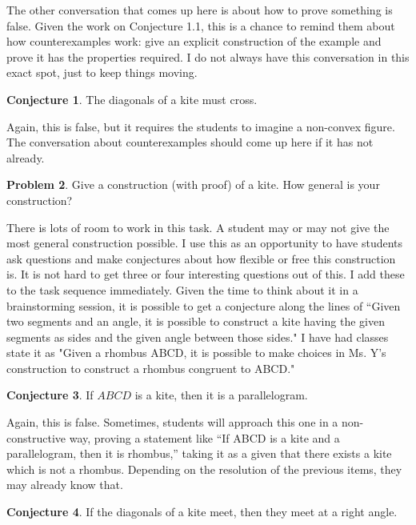 \documentclass{tufte-handout}
\theoremstyle{definition}
\newtheorem{problem}{Problem}[section]
\newtheorem{conjecture}[problem]{Conjecture}
\begin{document}
The other conversation that comes up here is about how to prove something is false. Given the work on Conjecture 1.1, this is a chance to remind them about how counterexamples work: give an explicit construction of the example and prove it has the properties required. I do not always have this conversation in this exact spot, just to keep things moving.

\begin{conjecture}
\label{conj:kite-diagonals-cross}
The diagonals of a kite must cross.
\end{conjecture}

Again, this is false, but it requires the students to imagine a non-convex figure. The conversation about counterexamples should come up here if it has not already.

\begin{problem}
\label{prob:construct-kites}
Give a construction (with proof) of a kite.
How general is your construction?
\end{problem}

There is lots of room to work in this task. A student may or may not give the most general construction possible. I use this as an opportunity to have students ask questions and make conjectures about how flexible or free this construction is. It is not hard to get three or four interesting questions out of this. I add these to the task sequence immediately. Given the time to think about it in a brainstorming session, it is possible to get a conjecture along the lines of ``Given two segments and an angle, it is possible to construct a kite having the given segments as sides and the given angle between those sides." I have had classes state it as "Given a rhombus ABCD, it is possible to make choices in Ms. Y's construction to construct a rhombus congruent to ABCD."

\begin{conjecture}
\label{conj:kite-is-parallelogram}
If $ABCD$ is a kite, then it is a parallelogram.
\end{conjecture}

Again, this is false. Sometimes, students will approach this one in a non-constructive way, proving a statement like ``If ABCD is a kite and a parallelogram, then it is rhombus,'' taking it as a given that there exists a kite which is not a rhombus. Depending on the resolution of the 
previous items, they may already know that.


\begin{conjecture}
\label{conj:kite-diagonals-perpendicular}
If the diagonals of a kite meet, then they meet at a right angle.
\end{conjecture}
\end{document}
